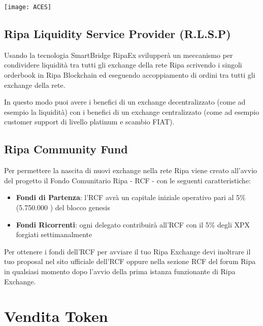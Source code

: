 \documentclass[11pt,fleqn,oneside]{book} %
\begin{document}
\begin{center}
	\texttt{[image: ACES]}
\end{center}

\section{Ripa Liquidity Service Provider (R.L.S.P)}
Usando la tecnologia SmartBridge RipaEx svilupperà un meccanismo per condividere liquidità tra tutti gli exchange della rete
Ripa scrivendo i singoli orderbook in Ripa Blockchain ed eseguendo accoppiamento di ordini tra tutti gli exchange della rete.

In questo modo puoi avere i benefici di un exchange decentralizzato (come ad esempio la liquidità) con i benefici di un 
exchange centralizzato (come ad esempio customer support di livello platinum e scambio FIAT).

\section{Ripa Community Fund}
Per permettere la nascita di nuovi exchange nella rete Ripa viene creato all'avvio del progetto il Fondo Comunitario Ripa - RCF - 
con le seguenti caratteristiche:
\begin{itemize}
	\item \textbf{Fondi di Partenza}: l'RCF avrà un capitale iniziale operativo pari al 5\% (5.750.000 \PHP) del blocco genesis
	\item \textbf{Fondi Ricorrenti}: ogni delegato contribuirà all'RCF con il 5\% degli XPX forgiati settimanalmente
\end{itemize}
\vspace{5mm}
Per ottenere i fondi dell'RCF per avviare il tuo Ripa Exchange devi inoltrare il tuo proposal nel sito ufficiale dell'RCF oppure
nella sezione RCF del forum Ripa in qualsiasi momento dopo l'avvio della prima istanza funzionante di Ripa Exchange.


\chapter{Vendita Token}
\end{document}
